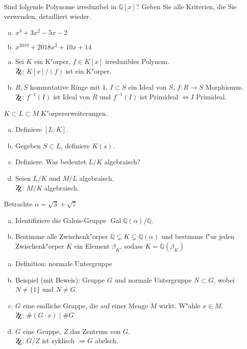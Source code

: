 \documentclass[a4paper,ngerman,12pt,addpoints]{exam}
\newcommand{\setQ}{\mathbb{Q}}
\DeclareMathOperator{\Gal}{Gal}
\begin{document}
		\begin{questions}
		\question[12]
			Sind folgende Polynome irreduzibel in $\setQ[x]$? Geben Sie alle Kriterien, die Sie verwenden, detailliert wieder.
			\begin{enumerate}[a)]
				\item $x^3+3x^2-5x-2$
				\item $x^{2019}+2018x^2+10x+14$
			\end{enumerate}
		\question[12]
			\begin{enumerate}[a)]
				\item Sei $K$ ein K"orper, $f \in K[x]$ irreduzibles Polynom.\\ $\mathrm{Z\kern-.3em\raise-0.5ex\hbox{Z}}$: $K[x]/(f)$ ist ein K"orper.
				\item $R, S$ kommutative Ringe mit 1, $I \subset S$ ein Ideal von $S$, $f: R \longrightarrow S$ Morphismus.\\
				$\mathrm{Z\kern-.3em\raise-0.5ex\hbox{Z}}$: $f^{-1}(I)$ ist Ideal von $R$ und $f^{-1}(I)$ ist Primideal $\Leftrightarrow I$ Primideal.
			\end{enumerate}
		\question[12]
			$K \subset L \subset M$ K"orpererweiterungen.
			\begin{enumerate}[a)]
				\item Definiere $[L:K]$.
				\item Gegeben $S \subset L$, definiere $K(s)$.
				\item Definiere: Was bedeutet $L/K$ algebraisch?
				\item Seien $L/K$ und $M/L$ algebraisch.\\ $\mathrm{Z\kern-.3em\raise-0.5ex\hbox{Z}}$: $M/K$ algebraisch.
			\end{enumerate}
		\question[12]
			Betrachte $\alpha = \sqrt{3}+\sqrt{7}$
			\begin{enumerate}[a)]
				\item Identifiziere die Galois-Gruppe $\Gal{\setQ(\alpha)/\setQ}$.
				\item Bestimme alle Zwischenk"orper $\setQ \subsetneq K \subsetneq \setQ(\alpha)$ und bestimme f"ur jeden Zwischenk"orper $K$ ein Element $\beta_K$, sodass $K=\setQ(\beta_K)$
			\end{enumerate}
		\question[12]
			\begin{enumerate}[a)]
				\item Definition: normale Untergruppe
				\item Beispiel (mit Beweis): Gruppe $G$ und normale Untergruppe $N \subset G$, wobei $N \neq \{1\}$ und $N \neq G$.
				\item $G$ eine endliche Gruppe, die auf einer Menge $M$ wirkt. W"ahle $x \in M$. \\
				$\mathrm{Z\kern-.3em\raise-0.5ex\hbox{Z}}$: $\#(G \cdot x) \mid \#G$
				\item $G$ eine Gruppe, $Z$ das Zentrum von $G$.\\
				$\mathrm{Z\kern-.3em\raise-0.5ex\hbox{Z}}$: $G/Z$ ist zyklisch $\Rightarrow G$ abelsch.
			\end{enumerate}
	\end{questions}
	\begin{center}
		\gradetable[h][questions]
	\end{center}
\end{document}
